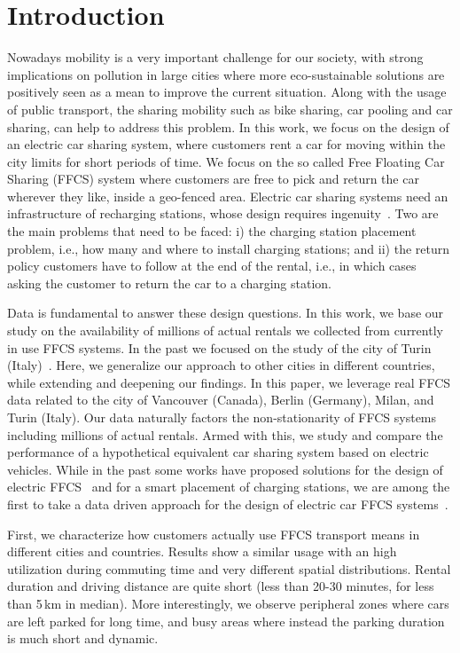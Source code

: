 \section{Introduction}
\label{sec:intro}

Nowadays mobility is a very important challenge for our society, with strong implications on pollution in large cities where more eco-sustainable solutions are positively seen as a mean to improve the current situation.
Along with the usage of public transport, the sharing mobility such as bike sharing, car pooling and car sharing, can help to address this problem. In this work,  we focus on the design of an electric car sharing system, where customers rent a car for moving within the city limits for short periods of time. We focus on the so called Free Floating Car Sharing (FFCS) system where customers are free to pick and return the car wherever they like, inside a geo-fenced area.
Electric car sharing systems need an infrastructure of recharging stations, whose design requires ingenuity~\cite{PlacementAndPowergrid,placementAustin,mipCSPpechino}. 
Two are the main problems that need to be faced: i) the charging station placement problem, i.e., how many and where to install charging stations; and ii) the return policy customers have to follow at the end of the rental, i.e., in which cases asking the customer to return the car to a charging station.

Data is fundamental to answer these design questions. In this work, we base our study on the availability of millions of actual rentals we collected from currently in use FFCS systems. In the past we focused on the study of the city of Turin (Italy)~\cite{taormina}. Here, we generalize our approach to other cities in different countries, while extending and deepening our findings. In this paper, we leverage real FFCS data related to the city of Vancouver (Canada), Berlin (Germany), Milan, and Turin (Italy).
Our data naturally factors the non-stationarity of FFCS systems including millions of actual rentals. Armed with this, we study and compare the performance of a hypothetical equivalent car sharing system based on electric vehicles.  While in the past some works have proposed solutions for the design of electric FFCS~\cite{FM15,WB15} and for a smart placement of charging stations, we are among the first to take a data driven approach for the design of electric car FFCS systems~\cite{ChargingStationForVehicularNetworks,mipCSPpechino,PlacementAndPowergrid,placementAustin}.

First, we characterize how customers actually use FFCS transport means in different cities and countries. Results show a similar usage with an high utilization during commuting time and very different spatial distributions. Rental duration and driving distance are quite short (less than 20-30 minutes, for less than 5\,km in median). More interestingly, we observe peripheral zones where cars are left parked for long time, and busy areas where instead the parking duration is much short and dynamic.

